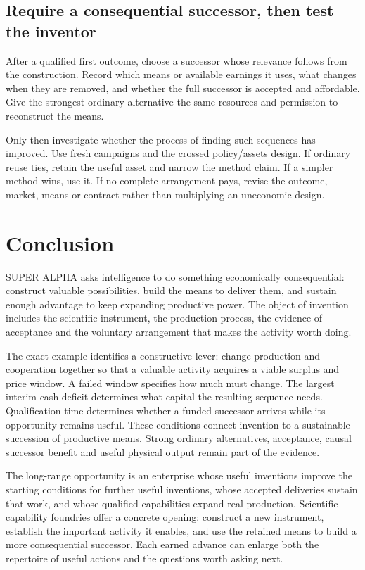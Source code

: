 \documentclass[11pt,letterpaper]{article}
\begin{document}
\subsection{Require a consequential successor, then test the inventor}
After a qualified first outcome, choose a successor whose relevance follows from the construction. Record which means or available earnings it uses, what changes when they are removed, and whether the full successor is accepted and affordable. Give the strongest ordinary alternative the same resources and permission to reconstruct the means.

Only then investigate whether the process of finding such sequences has improved. Use fresh campaigns and the crossed policy/assets design. If ordinary reuse ties, retain the useful asset and narrow the method claim. If a simpler method wins, use it. If no complete arrangement pays, revise the outcome, market, means or contract rather than multiplying an uneconomic design.

\section{Conclusion}
SUPER ALPHA asks intelligence to do something economically consequential: construct valuable possibilities, build the means to deliver them, and sustain enough advantage to keep expanding productive power. The object of invention includes the scientific instrument, the production process, the evidence of acceptance and the voluntary arrangement that makes the activity worth doing.

The exact example identifies a constructive lever: change production and cooperation together so that a valuable activity acquires a viable surplus and price window. A failed window specifies how much must change. The largest interim cash deficit determines what capital the resulting sequence needs. Qualification time determines whether a funded successor arrives while its opportunity remains useful. These conditions connect invention to a sustainable succession of productive means. Strong ordinary alternatives, acceptance, causal successor benefit and useful physical output remain part of the evidence.

The long-range opportunity is an enterprise whose useful inventions improve the starting conditions for further useful inventions, whose accepted deliveries sustain that work, and whose qualified capabilities expand real production. Scientific capability foundries offer a concrete opening: construct a new instrument, establish the important activity it enables, and use the retained means to build a more consequential successor. Each earned advance can enlarge both the repertoire of useful actions and the questions worth asking next.
\end{document}
